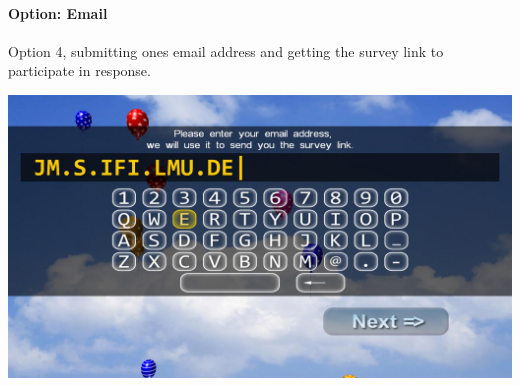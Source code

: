 \clearpage
\paragraph{Option: Email}
\label{screenshot:email-option}
Option 4, submitting ones email address and getting the survey link to participate in response.

\begin{center}
    \includegraphics[width=\columnwidth]{img/screenshots/balloon-game/option-email.jpg}
\end{center}


